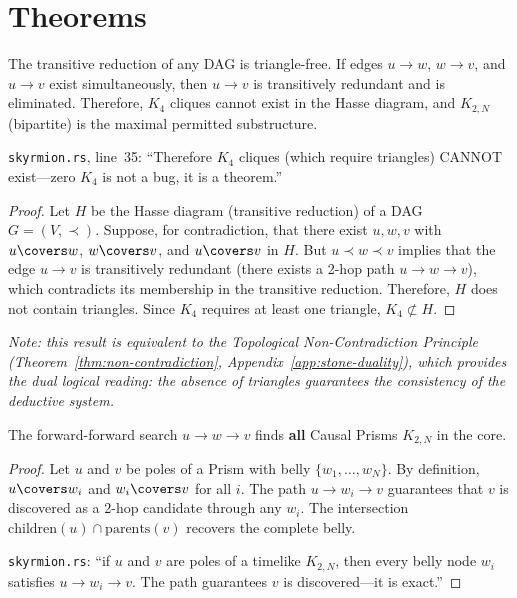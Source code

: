 \section{Theorems}

\begin{theorem}
\label{thm:app-triangle-free}
The transitive reduction of any DAG is triangle-free.
If edges $u \to w$, $w \to v$, and $u \to v$ exist
simultaneously, then $u \to v$ is transitively redundant
and is eliminated. Therefore, $K_4$ cliques cannot exist
in the Hasse diagram, and $K_{2,N}$ (bipartite) is the maximal
permitted substructure.

\medskip\noindent
\texttt{skyrmion.rs}, line~35: ``Therefore $K_4$ cliques
(which require triangles) CANNOT exist---zero $K_4$ is not a bug,
it is a theorem.''
\end{theorem}

\begin{proof}
Let $H$ be the Hasse diagram (transitive reduction) of a DAG
$G = (V, \prec)$. Suppose, for contradiction, that there exist
$u, w, v$ with $u \covers w$, $w \covers v$, and
$u \covers v$ in $H$. But $u \prec w \prec v$ implies that
the edge $u \to v$ is transitively redundant (there exists a
2-hop path $u \to w \to v$), which contradicts its
membership in the transitive reduction. Therefore, $H$ does not
contain triangles. Since $K_4$ requires at least one
triangle, $K_4 \not\subset H$.
\end{proof}

\smallskip\noindent
{\small\itshape Note: this result is equivalent to the Topological
Non-Contradiction Principle
(Theorem~\ref{thm:non-contradiction},
Appendix~\ref{app:stone-duality}), which provides the dual
logical reading: the absence of triangles guarantees the consistency
of the deductive system.}

\begin{theorem}
\label{thm:app-2hop}
The forward-forward search $u \to w \to v$ finds
\textbf{all} Causal Prisms $K_{2,N}$ in the core.
\end{theorem}

\begin{proof}
Let $u$ and $v$ be poles of a Prism with belly
$\{w_1,\ldots,w_N\}$. By definition, $u \covers w_i$ and
$w_i \covers v$ for all $i$. The path
$u \to w_i \to v$ guarantees that $v$ is discovered as a 2-hop
candidate through any $w_i$. The intersection
$\text{children}(u) \cap \text{parents}(v)$ recovers the complete
belly.

\medskip\noindent
\texttt{skyrmion.rs}: ``if $u$ and $v$ are poles of a timelike
$K_{2,N}$, then every belly node $w_i$ satisfies
$u \to w_i \to v$. The path guarantees $v$ is discovered---it is
exact.''
\end{proof}

